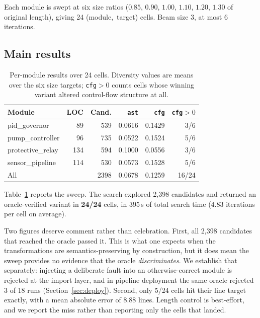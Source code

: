 \documentclass[10pt,twocolumn]{article}
\newcommand{\code}[1]{\texttt{\small #1}}
\begin{document}
Each module is swept at six size ratios ($0.85$, $0.90$, $1.00$, $1.10$,
$1.20$, $1.30$ of original length), giving 24 (module,~target) cells. Beam size
3, at most 6 iterations.

\subsection{Main results}

\begin{table}[t]
\centering
\caption{Per-module results over 24 cells. Diversity values are means over the
six size targets; \code{cfg${>}0$} counts cells whose winning variant altered
control-flow structure at all.}
\label{tab:main}
\small
\setlength{\tabcolsep}{4pt}
\begin{tabular}{lrrrrr}
\toprule
Module & LOC & Cand. & \code{ast} & \code{cfg} & \code{cfg${>}0$} \\
\midrule
pid\_governor      &  89 &  539 & 0.0616 & 0.1429 & 3/6 \\
pump\_controller   &  96 &  735 & 0.0522 & 0.1524 & 5/6 \\
protective\_relay  & 134 &  594 & 0.1000 & 0.0556 & 3/6 \\
sensor\_pipeline   & 114 &  530 & 0.0573 & 0.1528 & 5/6 \\
\midrule
All                &     & 2398 & 0.0678 & 0.1259 & 16/24 \\
\bottomrule
\end{tabular}
\end{table}

Table~\ref{tab:main} reports the sweep. The search explored 2{,}398 candidates
and returned an oracle-verified variant in \textbf{24/24} cells, in 395\,s of
total search time (4.83 iterations per cell on average).

Two figures deserve comment rather than celebration. First, all 2{,}398
candidates that reached the oracle passed it. This is what one expects when the
transformations are semantics-preserving by construction, but it does mean the
sweep provides no evidence that the oracle \emph{discriminates}. We establish
that separately: injecting a deliberate fault into an otherwise-correct module
is rejected at the import layer, and in pipeline deployment the same oracle
rejected 3 of 18 runs (Section~\ref{sec:deploy}). Second, only 5/24 cells hit
their line target exactly, with a mean absolute error of 8.88 lines. Length
control is best-effort, and we report the miss rather than reporting only the
cells that landed.
\end{document}
